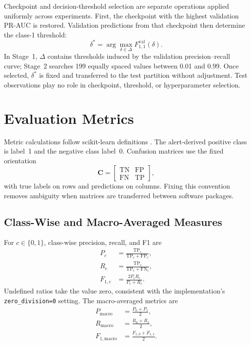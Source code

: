 \documentclass[11pt,fleqn]{report}
\begin{document}
Checkpoint and decision-threshold selection are separate operations applied uniformly across experiments. First, the checkpoint with the highest validation PR-AUC is restored. Validation predictions from that checkpoint then determine the class-1 threshold:
\begin{equation}
    \delta^{*}
    =\arg\max_{\delta\in\Delta}
      F_{1,1}^{\mathrm{val}}(\delta).
    \label{eq:validation_threshold_selection}
\end{equation}
In Stage~1, $\Delta$ contains thresholds induced by the validation precision--recall curve; Stage~2 searches 199 equally spaced values between 0.01 and 0.99. Once selected, $\delta^{*}$ is fixed and transferred to the test partition without adjustment. Test observations play no role in checkpoint, threshold, or hyperparameter selection.

\section{Evaluation Metrics}
\label{subsec:experimental_metrics}

Metric calculations follow scikit-learn definitions \cite{Pedregosa2011ScikitLearn}. The alert-derived positive class is label~1 and the negative class label~0. Confusion matrices use the fixed orientation
\begin{equation}
    \mathbf{C}=
    \begin{bmatrix}
        \mathrm{TN} & \mathrm{FP}\\
        \mathrm{FN} & \mathrm{TP}
    \end{bmatrix},
    \label{eq:experimental_confusion_matrix}
\end{equation}
with true labels on rows and predictions on columns. Fixing this convention removes ambiguity when matrices are transferred between software packages.

\subsection{Class-Wise and Macro-Averaged Measures}
\label{subsubsec:macro_metrics}

For $c\in\{0,1\}$, class-wise precision, recall, and F1 are
\begin{align}
    P_c &= \frac{\mathrm{TP}_c}
    {\mathrm{TP}_c+\mathrm{FP}_c}, \\
    R_c &= \frac{\mathrm{TP}_c}
    {\mathrm{TP}_c+\mathrm{FN}_c}, \\
    F_{1,c} &= \frac{2P_cR_c}{P_c+R_c}.
    \label{eq:classwise_metrics}
\end{align}
Undefined ratios take the value zero, consistent with the implementation's
\texttt{zero\_division=0} setting. The macro-averaged metrics are
\begin{align}
    P_{\mathrm{macro}} &= \frac{P_0+P_1}{2}, \\
    R_{\mathrm{macro}} &= \frac{R_0+R_1}{2}, \\
    F_{1,\mathrm{macro}} &= \frac{F_{1,0}+F_{1,1}}{2}.
    \label{eq:experimental_macro_metrics}
\end{align}
\end{document}
